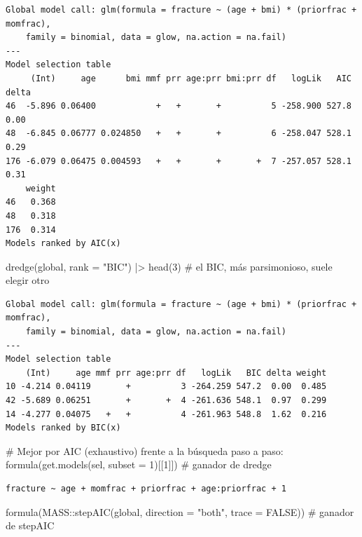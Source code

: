 \documentclass[
  letterpaper,
  DIV=11,
  numbers=noendperiod]{scrartcl}
\newenvironment{Shaded}{\begin{snugshade}}{\end{snugshade}}
\newcommand{\AttributeTok}[1]{\textcolor[rgb]{0.40,0.45,0.13}{#1}}
\newcommand{\CommentTok}[1]{\textcolor[rgb]{0.37,0.37,0.37}{#1}}
\newcommand{\ConstantTok}[1]{\textcolor[rgb]{0.56,0.35,0.01}{#1}}
\newcommand{\DecValTok}[1]{\textcolor[rgb]{0.68,0.00,0.00}{#1}}
\newcommand{\FunctionTok}[1]{\textcolor[rgb]{0.28,0.35,0.67}{#1}}
\newcommand{\NormalTok}[1]{\textcolor[rgb]{0.00,0.23,0.31}{#1}}
\newcommand{\SpecialCharTok}[1]{\textcolor[rgb]{0.37,0.37,0.37}{#1}}
\newcommand{\StringTok}[1]{\textcolor[rgb]{0.13,0.47,0.30}{#1}}
\begin{document}
\begin{verbatim}
Global model call: glm(formula = fracture ~ (age + bmi) * (priorfrac + momfrac), 
    family = binomial, data = glow, na.action = na.fail)
---
Model selection table 
     (Int)     age      bmi mmf prr age:prr bmi:prr df   logLik   AIC delta
46  -5.896 0.06400            +   +       +          5 -258.900 527.8  0.00
48  -6.845 0.06777 0.024850   +   +       +          6 -258.047 528.1  0.29
176 -6.079 0.06475 0.004593   +   +       +       +  7 -257.057 528.1  0.31
    weight
46   0.368
48   0.318
176  0.314
Models ranked by AIC(x) 
\end{verbatim}

\begin{Shaded}
\begin{Highlighting}[]
\FunctionTok{dredge}\NormalTok{(global, }\AttributeTok{rank =} \StringTok{"BIC"}\NormalTok{) }\SpecialCharTok{|\textgreater{}} \FunctionTok{head}\NormalTok{(}\DecValTok{3}\NormalTok{)   }\CommentTok{\# el BIC, más parsimonioso, suele elegir otro}
\end{Highlighting}
\end{Shaded}

\begin{verbatim}
Global model call: glm(formula = fracture ~ (age + bmi) * (priorfrac + momfrac), 
    family = binomial, data = glow, na.action = na.fail)
---
Model selection table 
    (Int)     age mmf prr age:prr df   logLik   BIC delta weight
10 -4.214 0.04119       +          3 -264.259 547.2  0.00  0.485
42 -5.689 0.06251       +       +  4 -261.636 548.1  0.97  0.299
14 -4.277 0.04075   +   +          4 -261.963 548.8  1.62  0.216
Models ranked by BIC(x) 
\end{verbatim}

\begin{Shaded}
\begin{Highlighting}[]
\CommentTok{\# Mejor por AIC (exhaustivo) frente a la búsqueda paso a paso:}
\FunctionTok{formula}\NormalTok{(}\FunctionTok{get.models}\NormalTok{(sel, }\AttributeTok{subset =} \DecValTok{1}\NormalTok{)[[}\DecValTok{1}\NormalTok{]])                          }\CommentTok{\# ganador de dredge}
\end{Highlighting}
\end{Shaded}

\begin{verbatim}
fracture ~ age + momfrac + priorfrac + age:priorfrac + 1
\end{verbatim}

\begin{Shaded}
\begin{Highlighting}[]
\FunctionTok{formula}\NormalTok{(MASS}\SpecialCharTok{::}\FunctionTok{stepAIC}\NormalTok{(global, }\AttributeTok{direction =} \StringTok{"both"}\NormalTok{, }\AttributeTok{trace =} \ConstantTok{FALSE}\NormalTok{))  }\CommentTok{\# ganador de stepAIC}
\end{Highlighting}
\end{Shaded}
\end{document}
